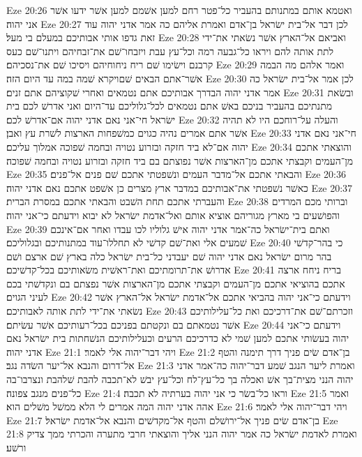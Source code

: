 Eze 20:26  ואטמא אותם במתנותם בהעביר כל־פטר רחם למען אשׁמם למען אשׁר ידעו אשׁר אני יהוה׃
Eze 20:27  לכן דבר אל־בית ישׂראל בן־אדם ואמרת אליהם כה אמר אדני יהוה עוד זאת גדפו אותי אבותיכם במעלם בי מעל׃
Eze 20:28  ואביאם אל־הארץ אשׁר נשׂאתי את־ידי לתת אותה להם ויראו כל־גבעה רמה וכל־עץ עבת ויזבחו־שׁם את־זבחיהם ויתנו־שׁם כעס קרבנם וישׂימו שׁם ריח ניחוחיהם ויסיכו שׁם את־נסכיהם׃
Eze 20:29  ואמר אלהם מה הבמה אשׁר־אתם הבאים שׁםויקרא שׁמה במה עד היום הזה׃
Eze 20:30  לכן אמר אל־בית ישׂראל כה אמר אדני יהוה הבדרך אבותיכם אתם נטמאים ואחרי שׁקוציהם אתם זנים׃
Eze 20:31  ובשׂאת מתנתיכם בהעביר בניכם באשׁ אתם נטמאים לכל־גלוליכם עד־היום ואני אדרשׁ לכם בית ישׂראל חי־אני נאם אדני יהוה אם־אדרשׁ לכם׃
Eze 20:32  והעלה על־רוחכם היו לא תהיה אשׁר אתם אמרים נהיה כגוים כמשׁפחות הארצות לשׁרת עץ ואבן׃
Eze 20:33  חי־אני נאם אדני יהוה אם־לא ביד חזקה ובזרוע נטויה ובחמה שׁפוכה אמלוך עליכם׃
Eze 20:34  והוצאתי אתכם מן־העמים וקבצתי אתכם מן־הארצות אשׁר נפוצתם בם ביד חזקה ובזרוע נטויה ובחמה שׁפוכה׃
Eze 20:35  והבאתי אתכם אל־מדבר העמים ונשׁפטתי אתכם שׁם פנים אל־פנים׃
Eze 20:36  כאשׁר נשׁפטתי את־אבותיכם במדבר ארץ מצרים כן אשׁפט אתכם נאם אדני יהוה׃
Eze 20:37  והעברתי אתכם תחת השׁבט והבאתי אתכם במסרת הברית׃
Eze 20:38  וברותי מכם המרדים והפושׁעים בי מארץ מגוריהם אוציא אותם ואל־אדמת ישׂראל לא יבוא וידעתם כי־אני יהוה׃
Eze 20:39  ואתם בית־ישׂראל כה־אמר אדני יהוה אישׁ גלוליו לכו עבדו ואחר אם־אינכם שׁמעים אלי ואת־שׁם קדשׁי לא תחללו־עוד במתנותיכם ובגלוליכם׃
Eze 20:40  כי בהר־קדשׁי בהר מרום ישׂראל נאם אדני יהוה שׁם יעבדני כל־בית ישׂראל כלה בארץ שׁם ארצם ושׁם אדרושׁ את־תרומתיכם ואת־ראשׁית משׂאותיכם בכל־קדשׁיכם׃
Eze 20:41  בריח ניחח ארצה אתכם בהוציאי אתכם מן־העמים וקבצתי אתכם מן־הארצות אשׁר נפצתם בם ונקדשׁתי בכם לעיני הגוים׃
Eze 20:42  וידעתם כי־אני יהוה בהביאי אתכם אל־אדמת ישׂראל אל־הארץ אשׁר נשׂאתי את־ידי לתת אותה לאבותיכם׃
Eze 20:43  וזכרתם־שׁם את־דרכיכם ואת כל־עלילותיכם אשׁר נטמאתם בם ונקטתם בפניכם בכל־רעותיכם אשׁר עשׂיתם׃
Eze 20:44  וידעתם כי־אני יהוה בעשׂותי אתכם למען שׁמי לא כדרכיכם הרעים וכעלילותיכם הנשׁחתות בית ישׂראל נאם אדני יהוה׃
Eze 21:1  ויהי דבר־יהוה אלי לאמר׃
Eze 21:2  בן־אדם שׂים פניך דרך תימנה והטף אל־דרום והנבא אל־יער השׂדה נגב׃
Eze 21:3  ואמרת ליער הנגב שׁמע דבר־יהוה כה־אמר אדני יהוה הנני מצית־בך אשׁ ואכלה בך כל־עץ־לח וכל־עץ יבשׁ לא־תכבה להבת שׁלהבת ונצרבו־בה כל־פנים מנגב צפונה׃
Eze 21:4  וראו כל־בשׂר כי אני יהוה בערתיה לא תכבה׃
Eze 21:5  ואמר אהה אדני יהוה המה אמרים לי הלא ממשׁל משׁלים הוא׃
Eze 21:6  ויהי דבר־יהוה אלי לאמר׃
Eze 21:7  בן־אדם שׂים פניך אל־ירושׁלם והטף אל־מקדשׁים והנבא אל־אדמת ישׂראל׃
Eze 21:8  ואמרת לאדמת ישׂראל כה אמר יהוה הנני אליך והוצאתי חרבי מתערה והכרתי ממך צדיק ורשׁע׃

